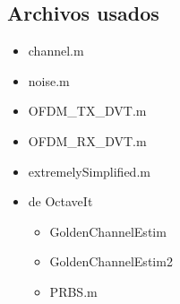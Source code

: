 \documentclass[11pt]{scrartcl} %
\begin{document}
\begin{preview}
\subsection{Archivos usados}
\begin{itemize}
	\item channel.m
	\item noise.m
	\item OFDM\_TX\_DVT.m
	\item OFDM\_RX\_DVT.m
	\item extremelySimplified.m
	\item de OctaveIt
	\begin{itemize}
		\item GoldenChannelEstim
		\item GoldenChannelEstim2
		\item PRBS.m
	\end{itemize}
\end{itemize}
\end{preview}























\end{document}
